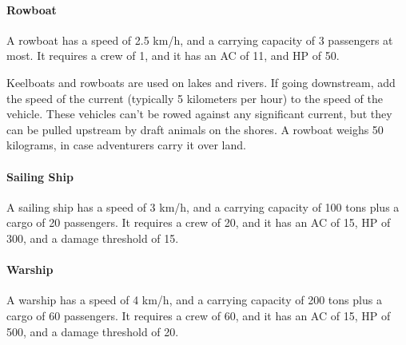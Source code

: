     \paragraph{Rowboat}
        A rowboat has a speed of 2.5 km/h, and a carrying capacity of 3 passengers at most.
        It requires a crew of 1, and it has an AC of 11, and HP of 50.

        Keelboats and rowboats are used on lakes and rivers.
        If going downstream, add the speed of the current (typically 5 kilometers per hour) to the speed of the vehicle.
        These vehicles can't be rowed against any significant current, but they can be pulled upstream by draft animals on the shores.
        A rowboat weighs 50 kilograms, in case adventurers carry it over land.
    \paragraph{Sailing Ship}
        A sailing ship has a speed of 3 km/h, and a carrying capacity of 100 tons plus a cargo of 20 passengers.
        It requires a crew of 20, and it has an AC of 15, HP of 300, and a damage threshold of 15.
    \paragraph{Warship}
        A warship has a speed of 4 km/h, and a carrying capacity of 200 tons plus a cargo of 60 passengers.
        It requires a crew of 60, and it has an AC of 15, HP of 500, and a damage threshold of 20.

